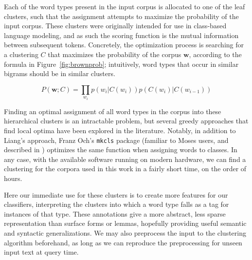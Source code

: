 Each of the word types present in the input corpus is allocated to one of the
leaf clusters, such that the assignment attempts to maximize the probability of
the input corpus.  These clusters were originally intended for use in
class-based language modeling, and as such the scoring function is the mutual
information between subsequent tokens. Concretely, the optimization process is
searching for a clustering $C$ that maximizes the probability of the corpus
$\boldsymbol{w}$, according to the formula in Figure~\ref{fig:brownprob};
intuitively, word types that occur in similar bigrams should be in similar
clusters.

\begin{figure*}

  \begin{equation} \label{eq:brownclassprob}
  P(\boldsymbol{w}; C) = \prod_{w_i} p(w_i | C(w_i)) p(C(w_i) | C(w_{i-1}))
  \end{equation}

  \caption{The Brown clustering expression for the probability of a corpus with
  a specific clustering $C$. It is the product, for each token, of the
  probability of that token given its cluster, and the probability of that
  current cluster given the previous cluster. This is analogous to the
  ``emission" and ``transition" probabilities used in an HMM-based tagger.}
  \label{fig:brownprob}
\end{figure*}

Finding an optimal assignment of all word types in the corpus into these
hierarchical clusters is an intractable problem, but several greedy approaches
that find local optima have been explored in the literature.  Notably, in
addition to Liang's approach, Franz Och's \texttt{mkcls} package (familiar to
Moses users, and described in \cite{och1999efficient}) optimizes the same
function when assigning words to classes. In any case, with the available
software running on modern hardware, we can find a clustering for the corpora
used in this work in a fairly short time, on the order of hours.

Here our immediate use for these clusters is to create more features for our
classifiers, interpreting the clusters into which a word type falls as a tag
for instances of that type. These annotations give a more abstract, less sparse
representation than surface forms or lemmas, hopefully providing useful
semantic and syntactic generalizations. We may also preprocess the input to
the clustering algorithm beforehand, as long as we can reproduce the
preprocessing for unseen input text at query time.

